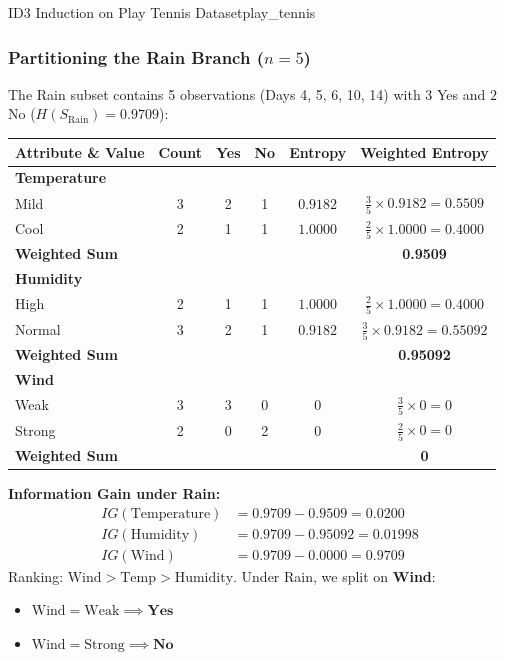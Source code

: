 \begin{example}{ID3 Induction on Play Tennis Dataset}{play_tennis}
\subsubsection{Partitioning the Rain Branch (\texorpdfstring{$n = 5$}{n = 5})}
The Rain subset contains 5 observations (Days 4, 5, 6, 10, 14) with $3$ Yes and $2$ No ($H(S_{\text{Rain}}) = 0.9709$):
\begin{center}\renewcommand{\arraystretch}{1.35}
\begin{tabular}{lccccc}
\toprule
\textbf{Attribute \& Value} & \textbf{Count} & \textbf{Yes} & \textbf{No} & \textbf{Entropy} & \textbf{Weighted Entropy} \\
\midrule
\textbf{Temperature} & & & & & \\
Mild & 3 & 2 & 1 & $0.9182$ & $\frac{3}{5} \times 0.9182 = 0.5509$ \\
Cool & 2 & 1 & 1 & $1.0000$ & $\frac{2}{5} \times 1.0000 = 0.4000$ \\
\textbf{Weighted Sum} & & & & & \textbf{0.9509} \\
\midrule
\textbf{Humidity} & & & & & \\
High & 2 & 1 & 1 & $1.0000$ & $\frac{2}{5} \times 1.0000 = 0.4000$ \\
Normal & 3 & 2 & 1 & $0.9182$ & $\frac{3}{5} \times 0.9182 = 0.55092$ \\
\textbf{Weighted Sum} & & & & & \textbf{0.95092} \\
\midrule
\textbf{Wind} & & & & & \\
Weak & 3 & 3 & 0 & $0$ & $\frac{3}{5} \times 0 = 0$ \\
Strong & 2 & 0 & 2 & $0$ & $\frac{2}{5} \times 0 = 0$ \\
\textbf{Weighted Sum} & & & & & \textbf{0} \\
\bottomrule
\end{tabular}
\end{center}

\textbf{Information Gain under Rain:}
\begin{align*}
    IG(\text{Temperature}) &= 0.9709 - 0.9509 = 0.0200 \\[4pt]
    IG(\text{Humidity}) &= 0.9709 - 0.95092 = 0.01998 \\[4pt]
    IG(\text{Wind}) &= 0.9709 - 0.0000 = \mathbf{0.9709}
\end{align*}
Ranking: $\text{Wind} > \text{Temp} > \text{Humidity}$.
Under Rain, we split on \textbf{Wind}:
\begin{itemize}
    \item $\text{Wind} = \text{Weak} \implies \mathbf{Yes}$
    \item $\text{Wind} = \text{Strong} \implies \mathbf{No}$
\end{itemize}


\end{example}
